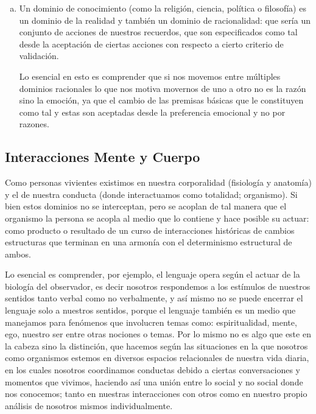 \documentclass[10pt]{article}
\begin{document}
\begin{enumerate}[a)]
            \item Un dominio de conocimiento (como la religión, ciencia, política o filosofía) es un dominio de la realidad y también un dominio de racionalidad: que sería un conjunto de acciones de nuestros recuerdos, que son especificados como tal desde la aceptación de ciertas acciones con respecto a cierto criterio de validación.
        
            Lo esencial en esto es comprender que si nos movemos entre múltiples dominios racionales lo que nos motiva movernos de uno a otro no es la razón sino la emoción, ya que el cambio de las premisas básicas que le constituyen como tal y estas son aceptadas desde la preferencia emocional y no por razones.
        \end{enumerate}
    

        \subsection{Interacciones Mente y Cuerpo}

        Como personas vivientes existimos en nuestra corporalidad (fisiología y anatomía) y el de nuestra conducta (donde interactuamos como totalidad; organismo). Si bien estos dominios no se interceptan, pero se acoplan de tal manera que el organismo la persona se acopla al medio que lo contiene y hace posible su actuar: como producto o resultado de un curso de interacciones históricas de cambios estructuras que terminan en una armonía con el determinismo estructural de ambos.
        
        Lo esencial es comprender, por ejemplo, el lenguaje opera según el actuar de la biología del observador, es decir nosotros respondemos a los estímulos de nuestros sentidos tanto verbal como no verbalmente, y así mismo no se puede encerrar el lenguaje solo a nuestros sentidos, porque el lenguaje también es un medio que manejamos para fenómenos que involucren temas como:  espiritualidad, mente, ego, nuestro ser entre otras nociones o temas. Por lo mismo no es algo que este en la cabeza sino la distinción, que hacemos según las situaciones en la que nosotros como organismos estemos  en diversos espacios relacionales de nuestra vida diaria, en los cuales nosotros coordinamos conductas debido a ciertas conversaciones y momentos que vivimos, haciendo así una unión entre lo social y no social donde nos conocemos; tanto en nuestras interacciones con otros como en nuestro propio análisis de nosotros mismos individualmente.
\end{document}
